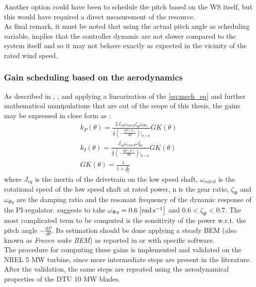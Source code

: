 Another option could have been to schedule the pitch based on the \acrshort{WS} itself, but this would have required a direct measurement of the resource. \\
As final remark, it must be noted that using the actual pitch angle as scheduling variable, implies that 
the controller dynamic are not slower compared to the system itself and so it may not behave exactly as expected in the vicinity of the rated wind speed.

\subsubsection{Gain scheduling based on the aerodynamics}\label{subsec:gain_schdeuling_NREL5MW}

As described in \cite{Aerodynamics_of_wind_turbines}, \cite{NREL_5MW_reference}, and \cite{ris_r_1500} applying a linearization of the \autoref{eq:mech_eq} and further mathematical manipulations that are out of the scope of this thesis, the gains may be expressed in close form as :
\begin{gather}
    k_P(\theta) = \frac{2J_{eq}\omega_{rated}\zeta_{\Phi}\omega_{\Phi\eta}}{\frac{1}{n}\left(-\frac{dP(\theta)}{d\theta}\right)\vert_{\theta=0}}GK(\theta)
    \label{eq:kp}\\
    k_I(\theta) = \frac{J_{eq}\omega_{rated}\omega_{\Phi\eta}^2}{\frac{1}{n}\left(-\frac{dP(\theta)}{d\theta}\right)\vert_{\theta=0}}GK(\theta)
    \label{eq:ki}\\
    GK(\theta) = \frac{1}{1+\frac{\theta}{\theta_K}} \label{eq:GK}
\end{gather}
where $J_{eq}$ is the inertia of the drivetrain on the low speed shaft, $\omega_{rated}$ is the rotational speed of the low speed shaft at rated power, n is the gear ratio, $\zeta_{\Phi}$ and $\omega_{\Phi\eta}$ are the damping ratio and the resonant frequency of the dynamic response of the PI-regulator. \cite{NREL_5MW_reference} suggests to take $\omega_{\Phi\eta}=0.6\left[\si{\radian\per\second}\right]$ and $0.6<\zeta_{\Phi}<0.7$. The most complicated term to be computed is the sensitivity of the power w.r.t. the pitch angle $-\frac{dP}{d\theta}$. Its estimation should be done applying a steady \acrshort{BEM} (also known as \textit{Frozen wake BEM}) as reported in \cite{Aerodynamics_of_wind_turbines} or with specific software. \\
The procedure for computing these gains is implemented and validated on the NREL 5 MW turbine, since more intermediate steps are present in the literature. After the validation, the same steps are repeated using the aerodynamical properties of the DTU 10 MW blades. \\
